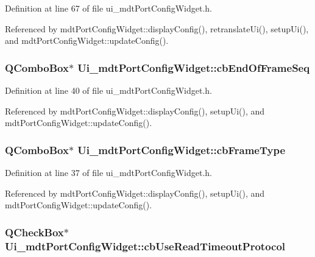 Definition at line 67 of file ui\-\_\-mdt\-Port\-Config\-Widget.\-h.



Referenced by mdt\-Port\-Config\-Widget\-::display\-Config(), retranslate\-Ui(), setup\-Ui(), and mdt\-Port\-Config\-Widget\-::update\-Config().

\hypertarget{class_ui__mdt_port_config_widget_a420d2e797a1a6dbf7e8756d85855c40d}{
\subsubsection[{cb\-End\-Of\-Frame\-Seq}]{\setlength{\rightskip}{0pt plus 5cm}Q\-Combo\-Box$\ast$ Ui\-\_\-mdt\-Port\-Config\-Widget\-::cb\-End\-Of\-Frame\-Seq}}\label{class_ui__mdt_port_config_widget_a420d2e797a1a6dbf7e8756d85855c40d}


Definition at line 40 of file ui\-\_\-mdt\-Port\-Config\-Widget.\-h.



Referenced by mdt\-Port\-Config\-Widget\-::display\-Config(), setup\-Ui(), and mdt\-Port\-Config\-Widget\-::update\-Config().

\hypertarget{class_ui__mdt_port_config_widget_a6617d0644b077d3c2121ffac409f37ea}{
\subsubsection[{cb\-Frame\-Type}]{\setlength{\rightskip}{0pt plus 5cm}Q\-Combo\-Box$\ast$ Ui\-\_\-mdt\-Port\-Config\-Widget\-::cb\-Frame\-Type}}\label{class_ui__mdt_port_config_widget_a6617d0644b077d3c2121ffac409f37ea}


Definition at line 37 of file ui\-\_\-mdt\-Port\-Config\-Widget.\-h.



Referenced by mdt\-Port\-Config\-Widget\-::display\-Config(), setup\-Ui(), and mdt\-Port\-Config\-Widget\-::update\-Config().

\hypertarget{class_ui__mdt_port_config_widget_a691a9c141b534354e9bae4015da092de}{
\subsubsection[{cb\-Use\-Read\-Timeout\-Protocol}]{\setlength{\rightskip}{0pt plus 5cm}Q\-Check\-Box$\ast$ Ui\-\_\-mdt\-Port\-Config\-Widget\-::cb\-Use\-Read\-Timeout\-Protocol}}\label{class_ui__mdt_port_config_widget_a691a9c141b534354e9bae4015da092de}


